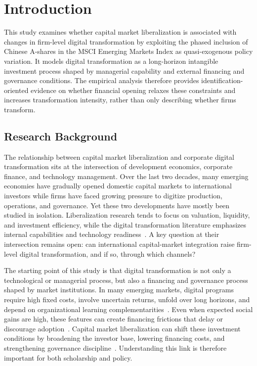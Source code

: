 \chapter{Introduction}
\label{chap:introduction}

This study examines whether capital market liberalization is associated with changes in firm-level digital transformation by exploiting the phased inclusion of Chinese A-shares in the MSCI Emerging Markets Index as quasi-exogenous policy variation. It models digital transformation as a long-horizon intangible investment process shaped by managerial capability and external financing and governance conditions. The empirical analysis therefore provides identification-oriented evidence on whether financial opening relaxes these constraints and increases transformation intensity, rather than only describing whether firms transform.

\section{Research Background}

The relationship between capital market liberalization and corporate digital transformation sits at the intersection of development economics, corporate finance, and technology management. Over the last two decades, many emerging economies have gradually opened domestic capital markets to international investors while firms have faced growing pressure to digitize production, operations, and governance. Yet these two developments have mostly been studied in isolation. Liberalization research tends to focus on valuation, liquidity, and investment efficiency, while the digital transformation literature emphasizes internal capabilities and technology readiness~\cite{Fang2024}. A key question at their intersection remains open: can international capital-market integration raise firm-level digital transformation, and if so, through which channels?

The starting point of this study is that digital transformation is not only a technological or managerial process, but also a financing and governance process shaped by market institutions. In many emerging markets, digital programs require high fixed costs, involve uncertain returns, unfold over long horizons, and depend on organizational learning complementarities~\cite{Chanias2019}. Even when expected social gains are high, these features can create financing frictions that delay or discourage adoption~\cite{ChenZhang2024}. Capital market liberalization can shift these investment conditions by broadening the investor base, lowering financing costs, and strengthening governance discipline~\cite{Barro1990}. Understanding this link is therefore important for both scholarship and policy.

